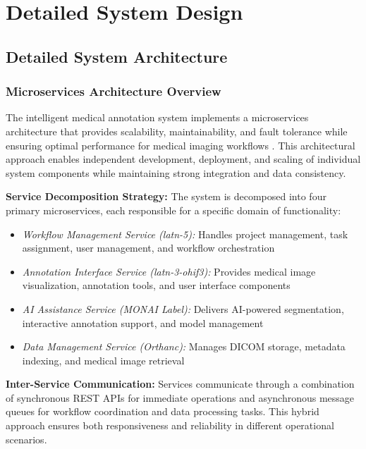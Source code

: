 \chapter{Detailed System Design}

\section{Detailed System Architecture}

\subsection{Microservices Architecture Overview}

The intelligent medical annotation system implements a microservices architecture that provides scalability, maintainability, and fault tolerance while ensuring optimal performance for medical imaging workflows \cite{newman2015building}. This architectural approach enables independent development, deployment, and scaling of individual system components while maintaining strong integration and data consistency.

\textbf{Service Decomposition Strategy:} The system is decomposed into four primary microservices, each responsible for a specific domain of functionality:

\begin{itemize}
    \item \textit{Workflow Management Service (latn-5):} Handles project management, task assignment, user management, and workflow orchestration
    \item \textit{Annotation Interface Service (latn-3-ohif3):} Provides medical image visualization, annotation tools, and user interface components
    \item \textit{AI Assistance Service (MONAI Label):} Delivers AI-powered segmentation, interactive annotation support, and model management
    \item \textit{Data Management Service (Orthanc):} Manages DICOM storage, metadata indexing, and medical image retrieval
\end{itemize}

\textbf{Inter-Service Communication:} Services communicate through a combination of synchronous REST APIs for immediate operations and asynchronous message queues for workflow coordination and data processing tasks. This hybrid approach ensures both responsiveness and reliability in different operational scenarios.

